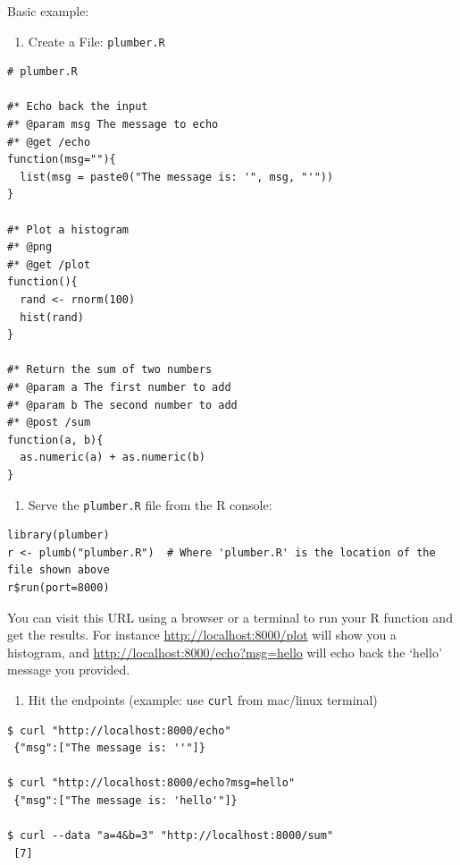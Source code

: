 \documentclass[]{book}
\providecommand{\tightlist}{%
  \setlength{\itemsep}{0pt}\setlength{\parskip}{0pt}}
\theoremstyle{definition}
\theoremstyle{definition}
\theoremstyle{definition}
\theoremstyle{remark}
\begin{document}
Basic example:

\begin{enumerate}
\def\labelenumi{\arabic{enumi}.}
\tightlist
\item
  Create a File: \texttt{plumber.R}
\end{enumerate}

\begin{verbatim}
# plumber.R

#* Echo back the input
#* @param msg The message to echo
#* @get /echo
function(msg=""){
  list(msg = paste0("The message is: '", msg, "'"))
}

#* Plot a histogram
#* @png
#* @get /plot
function(){
  rand <- rnorm(100)
  hist(rand)
}

#* Return the sum of two numbers
#* @param a The first number to add
#* @param b The second number to add
#* @post /sum
function(a, b){
  as.numeric(a) + as.numeric(b)
}
\end{verbatim}

\begin{enumerate}
\def\labelenumi{\arabic{enumi}.}
\setcounter{enumi}{1}
\tightlist
\item
  Serve the \texttt{plumber.R} file from the R console:
\end{enumerate}

\begin{verbatim}
library(plumber)
r <- plumb("plumber.R")  # Where 'plumber.R' is the location of the file shown above
r$run(port=8000)
\end{verbatim}

You can visit this URL using a browser or a terminal to run your R
function and get the results. For instance
\url{http://localhost:8000/plot} will show you a histogram, and
\url{http://localhost:8000/echo?msg=hello} will echo back the `hello'
message you provided.

\begin{enumerate}
\def\labelenumi{\arabic{enumi}.}
\setcounter{enumi}{2}
\tightlist
\item
  Hit the endpoints (example: use \texttt{curl} from mac/linux terminal)
\end{enumerate}

\begin{verbatim}
$ curl "http://localhost:8000/echo"
 {"msg":["The message is: ''"]}
 
$ curl "http://localhost:8000/echo?msg=hello"
 {"msg":["The message is: 'hello'"]}
 
$ curl --data "a=4&b=3" "http://localhost:8000/sum"
 [7]
\end{verbatim}
\end{document}
